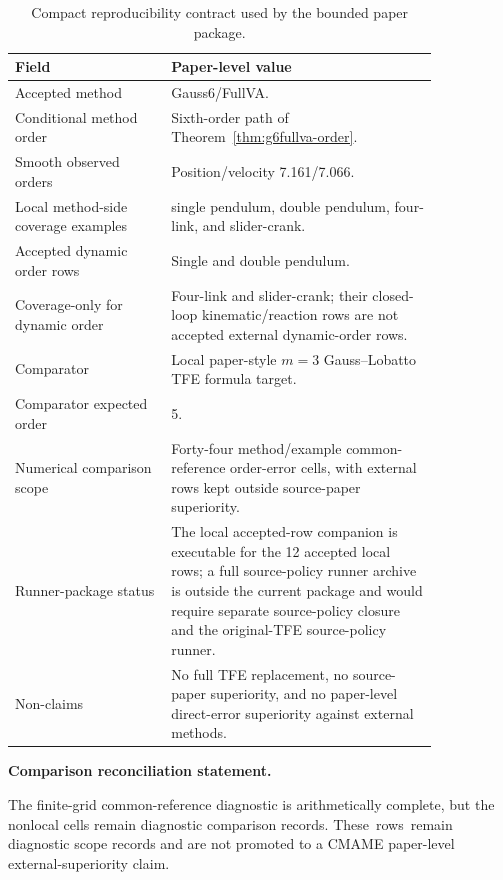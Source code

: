 \documentclass[preprint,12pt]{elsarticle}
\newcommand{\tfe}{TFE}
\begin{document}
\begin{table}[htbp]
\centering
\caption{Compact reproducibility contract used by the bounded paper package.}
\label{tab:artifact-contract}
\begin{tabular}{P{0.31\linewidth}P{0.53\linewidth}}
\toprule
Field & Paper-level value \\
\midrule
Accepted method & Gauss6/FullVA. \\
Conditional method order & Sixth-order path of
Theorem~\ref{thm:g6fullva-order}. \\
Smooth observed orders & Position/velocity 7.161/7.066. \\
Local method-side coverage examples & single pendulum, double pendulum, four-link, and
slider-crank. \\
Accepted dynamic order rows & Single and double pendulum. \\
Coverage-only for dynamic order & Four-link and slider-crank; their
closed-loop kinematic/reaction rows are not
accepted external dynamic-order rows. \\
Comparator & Local paper-style $m=3$ Gauss--Lobatto \tfe{} formula target. \\
Comparator expected order & 5. \\
Numerical comparison scope & Forty-four method/example common-reference
order-error cells, with external rows kept outside source-paper superiority. \\
Runner-package status & The local accepted-row companion is executable for
the 12 accepted local rows; a full source-policy runner archive is outside
the current package and would require separate source-policy closure and the
original-\tfe{} source-policy runner. \\
Non-claims & No full \tfe{} replacement, no source-paper superiority, and no
paper-level direct-error superiority against external methods. \\
\bottomrule
\end{tabular}
\end{table}

\noindent\textbf{Comparison reconciliation statement.}\par\noindent
The finite-grid common-reference diagnostic is arithmetically complete, but
the nonlocal cells remain diagnostic comparison records. \mbox{These rows remain}
diagnostic scope records and are not promoted to a CMAME paper-level
external-superiority claim.
\end{document}

